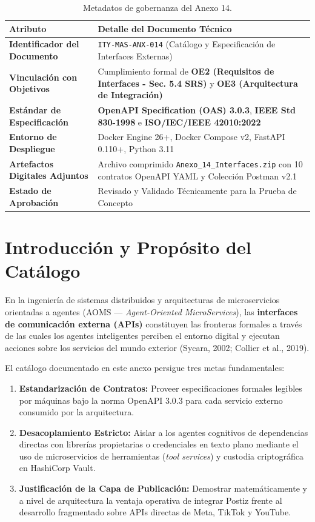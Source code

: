 \documentclass[11pt,a4paper]{article}
\begin{document}
\begin{table}[h!]
\centering
\small
\begin{tabular}{p{5.5cm} p{10cm}}
\toprule
\textbf{Atributo} & \textbf{Detalle del Documento Técnico} \\
\midrule
\textbf{Identificador del Documento} & \texttt{ITY-MAS-ANX-014} (Catálogo y Especificación de Interfaces Externas) \\
\textbf{Vinculación con Objetivos} & Cumplimiento formal de \textbf{OE2 (Requisitos de Interfaces - Sec. 5.4 SRS)} y \textbf{OE3 (Arquitectura de Integración)} \\
\textbf{Estándar de Especificación} & \textbf{OpenAPI Specification (OAS) 3.0.3}, \textbf{IEEE Std 830-1998} e \textbf{ISO/IEC/IEEE 42010:2022} \\
\textbf{Entorno de Despliegue} & Docker Engine 26+, Docker Compose v2, FastAPI 0.110+, Python 3.11 \\
\textbf{Artefactos Digitales Adjuntos} & Archivo comprimido \texttt{Anexo\_14\_Interfaces.zip} con 10 contratos OpenAPI YAML y Colección Postman v2.1 \\
\textbf{Estado de Aprobación} & Revisado y Validado Técnicamente para la Prueba de Concepto \\
\bottomrule
\end{tabular}
\caption{Metadatos de gobernanza del Anexo 14.}
\end{table}

\section{Introducción y Propósito del Catálogo}\label{sec:intro}

En la ingeniería de sistemas distribuidos y arquitecturas de microservicios orientadas a agentes (AOMS --- \textit{Agent-Oriented MicroServices}), las \textbf{interfaces de comunicación externa (APIs)} constituyen las fronteras formales a través de las cuales los agentes inteligentes perciben el entorno digital y ejecutan acciones sobre los servicios del mundo exterior (Sycara, 2002; Collier et al., 2019).

El catálogo documentado en este anexo persigue tres metas fundamentales:
\begin{enumerate}[label=\alph*)]
    \item \textbf{Estandarización de Contratos:} Proveer especificaciones formales legibles por máquinas bajo la norma OpenAPI 3.0.3 para cada servicio externo consumido por la arquitectura.
    \item \textbf{Desacoplamiento Estricto:} Aislar a los agentes cognitivos de dependencias directas con librerías propietarias o credenciales en texto plano mediante el uso de microservicios de herramientas (\textit{tool services}) y custodia criptográfica en HashiCorp Vault.
    \item \textbf{Justificación de la Capa de Publicación:} Demostrar matemáticamente y a nivel de arquitectura la ventaja operativa de integrar Postiz frente al desarrollo fragmentado sobre APIs directas de Meta, TikTok y YouTube.
\end{enumerate}
\end{document}
